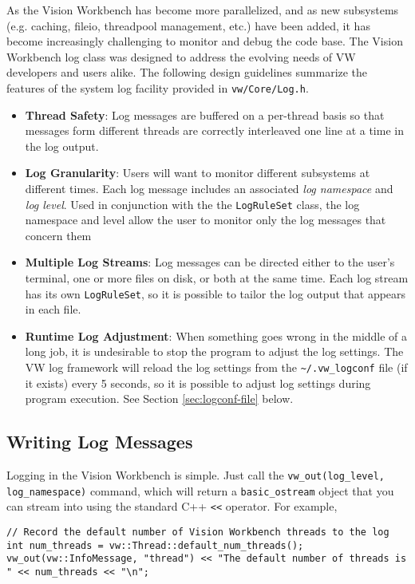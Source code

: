 As the Vision Workbench has become more parallelized, and as new
subsystems (e.g. caching, fileio, threadpool management, etc.) have
been added, it has become increasingly challenging to monitor and
debug the code base.  The Vision Workbench log class was designed to
address the evolving needs of VW developers and users alike.  The
following design guidelines summarize the features of the system log
facility provided in \verb#vw/Core/Log.h#.   

\begin{itemize}
\item {\bf Thread Safety}: Log messages are buffered on a
  per-thread basis so that messages form different threads are
  correctly interleaved one line at a time in the log output.
\item {\bf Log Granularity}: Users will want to monitor different
  subsystems at different times.  Each log message includes an
  associated {\em log namespace} and {\em log level}.  Used in
  conjunction with the the \verb#LogRuleSet# class, the log namespace
  and level allow the user to monitor only the log messages that
  concern them
\item {\bf Multiple Log Streams}: Log messages can be directed either
  to the user's terminal, one or more files on disk, or both at the
  same time.  Each log stream has its own \verb#LogRuleSet#, so it is
  possible to tailor the log output that appears in each file.
\item {\bf Runtime Log Adjustment}: When something goes wrong in the
  middle of a long job, it is undesirable to stop the program to
  adjust the log settings.  The VW log framework will reload the log
  settings from the \verb#~/.vw_logconf# file (if it exists) every
  5 seconds, so it is possible to adjust log settings during program
  execution.  See Section \ref{sec:logconf-file} below.
\end{itemize}

\subsection{Writing Log Messages}

Logging in the Vision Workbench is simple.  Just call the
\verb#vw_out(log_level, log_namespace)# command, which will return a
\verb#basic_ostream# object that you can stream into using the standard C++
\verb#<<# operator.  For example,

\begin{verbatim}
// Record the default number of Vision Workbench threads to the log
int num_threads = vw::Thread::default_num_threads();
vw_out(vw::InfoMessage, "thread") << "The default number of threads is " << num_threads << "\n";
\end{verbatim}

